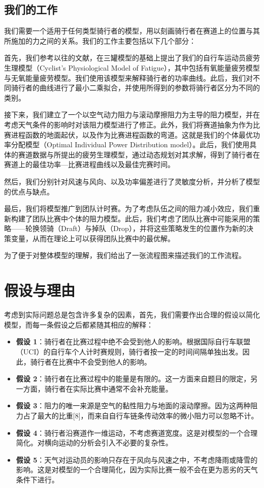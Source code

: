 \documentclass[11pt,a4paper]{ctexart}
\begin{document}
\subsection{我们的工作}

我们需要一个适用于任何类型骑行者的模型，用以刻画骑行者在赛道上的位置与其所施加的力之间的关系。我们的工作主要包括以下几个部分：

首先，我们参考以往的文献，在三罐模型的基础上提出了我们的自行车运动员疲劳生理模型（Cyclist's Physiological Model of Fatigue），其中包括有氧能量疲劳模型与无氧能量疲劳模型。我们使用该模型来解释骑行者的功率曲线。此后，我们对不同骑行者的曲线进行了最小二乘拟合，并使用所得到的参数将骑行者区分为不同的类别。

接下来，我们建立了一个以空气动力阻力与滚动摩擦阻力为主导的阻力模型，并在考虑天气条件的影响时对该阻力模型进行了修正。此外，我们将赛道抽象为作为比赛进程函数的地面起伏，以及作为比赛进程函数的弯道。这就是我们的个体最优功率分配模型（Optimal Individual Power Distribution model）。此后，我们使用具体的赛道数据与所提出的疲劳生理模型，通过动态规划对其求解，得到了骑行者在赛道上的最佳功率—比赛进程曲线以及最佳完赛时间。

然后，我们分别针对风速与风向、以及功率偏差进行了灵敏度分析，并分析了模型的优点与缺点。

最后，我们将模型推广到团队计时赛。为了考虑队伍之间的阻力减小效应，我们重新构建了团队比赛中个体的阻力模型。此后，我们考虑了团队比赛中可能采用的策略——轮换领骑（Draft）与掉队（Drop），并将这些策略发生的位置作为新的决策变量，从而在理论上可以获得团队比赛中的最优解。

为了便于对整体模型的理解，我们给出了一张流程图来描述我们的工作流程。

\section{假设与理由}

考虑到实际问题总是包含许多复杂的因素，首先，我们需要作出合理的假设以简化模型，而每一条假设之后都紧随其相应的解释：

\begin{itemize}
\item \textbf{假设 1}：骑行者在比赛过程中绝不会受到他人的影响。根据国际自行车联盟（UCI）的自行车个人计时赛规则，骑行者按一定的时间间隔单独出发。因此，骑行者在比赛中不会受到他人的影响。
\item \textbf{假设 2}：骑行者在比赛过程中的能量是有限的。这一方面来自题目的限定，另一方面，骑行者在实际比赛中通常不会补充能量。
\item \textbf{假设 3}：阻力的唯一来源是空气的黏性阻力与地面的滚动摩擦。因为这两种阻力占了最大的比重[8]，而来自自行车链条传动效率的微小阻力可以忽略不计。
\item \textbf{假设 4}：骑行者沿赛道作一维运动，不考虑赛道宽度。这是对模型的一个合理简化。对横向运动的分析会引入不必要的复杂性。
\item \textbf{假设 5}：天气对运动员的影响只存在于风向与风速之中，不考虑降雨或降雪的影响。这是对模型的一个合理简化，因为实际比赛一般不会在更为恶劣的天气条件下进行。
\end{itemize}
\end{document}
